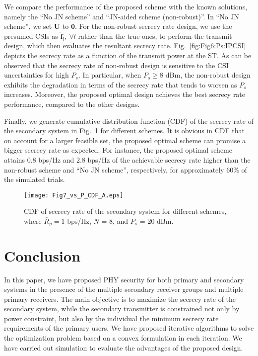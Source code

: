 \documentclass[journal,twoside]{IEEEtran}
\begin{document}
We  compare the performance of the proposed scheme with  the known solutions, namely the ``No JN scheme'' \cite{Pei} and ``JN-aided scheme (non-robust)''. In ``No JN scheme'', we set $\mathbf{U}$  to $\mathbf{0}$.  For the non-robust secrecy rate design, we use the presumed CSIs as $\hat{\mathbf{f}}_l,\ \forall l$ rather than the true ones, to perform the transmit design, which then evaluates the resultant  secrecy rate. Fig.~\ref{fig:Fig6:Ps:IPCSI} depicts the  secrecy rate  as a function of the transmit power at the ST. As can be observed that the secrecy rate of non-robust design  is sensitive to the CSI uncertainties for high $P_s$. In particular, when $P_{s} \geq 8$ dBm, the non-robust design exhibits the degradation in terms of the secrecy rate that tends to worsen as $P_{s} $ increases. Moreover, the proposed optimal design achieves the best secrecy rate performance, compared to the other designs.

 

Finally, we generate cumulative distribution function (CDF) of the secrecy rate of the secondary system  in Fig.~\ref{fig:CDF} for different schemes. It is obvious in  CDF that on account for a larger feasible set, the proposed optimal scheme can promise a bigger secrecy rate as expected.  For instance, the proposed optimal scheme attains 0.8 bps/Hz and 2.8 bps/Hz of the achievable secrecy rate  higher than the non-robust scheme and ``No JN scheme'', respectively, for approximately $60\%$ of the simulated trials.



\begin{figure}
           \texttt{[image: Fig7\_vs\_P\_CDF\_A.eps]}
 	  \caption{CDF of secrecy rate of the secondary system for  different schemes, where $\bar{R}_{p} = 1$ bps/Hz, $N$ = 8, and $P_s$ = 20 dBm.}\label{fig:CDF}
\end{figure}
 
\vspace{-0.3cm}
\section{Conclusion}\label{Conclusion}
In this paper, we  have proposed  PHY security for both  primary and secondary systems in the presence of the multiple secondary receiver groups and multiple primary receivers.  The main objective  is to maximize the secrecy rate of the secondary system, while the secondary transmitter is constrained not only by  power constraint, but also by the individual the minimum secrecy rate requirements of the primary users.  We have proposed iterative  algorithms to solve the optimization problem based on a convex formulation in each iteration.  We have carried out  simulation  to evaluate the advantages of the proposed design. 
\end{document}
